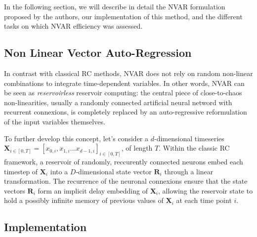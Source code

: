 In the following section, we will describe in detail the NVAR formulation proposed by the authors, our implementation
of this method, and the different tasks on which NVAR efficiency was assessed.


\subsection{Non Linear Vector Auto-Regression}

In contrast with classical RC methods, NVAR does not rely on random non-linear combinations to
integrate time-dependent variables. In other words, NVAR can be seen as \emph{reservoirless} 
reservoir computing: the central piece of close-to-chaos non-linearities, usually a randomly
connected artificial neural netword with recurrent connexions, is completely replaced 
by an auto-regressive reformulation of the input variables themselves. 

To further develop this concept, let's consider a $d$-dimensional timeseries 
$\mathbf{X}_{i \in [0, T]} = [x_{0, i}, x_{1, i} \dots x_{d-1, i}]_{i \in [0, T]}$, of length $T$.
Within the classic RC framework, a reservoir of randomly, reccurently connected neurons
embed each timestep of $\mathbf{X}_i$ into a $D$-dimensional state vector $\mathbf{R}_i$
through a linear transformation. 
The recurrence of the neuronal connexions ensure that the state vectors $\mathbf{R}_i$ 
form an implicit delay embedding of $\mathbf{X}_i$, allowing the reservoir state to hold 
a possibly infinite memory of previous values of $\mathbf{X}_i$ at each time point $i$.


\subsection{Implementation}

